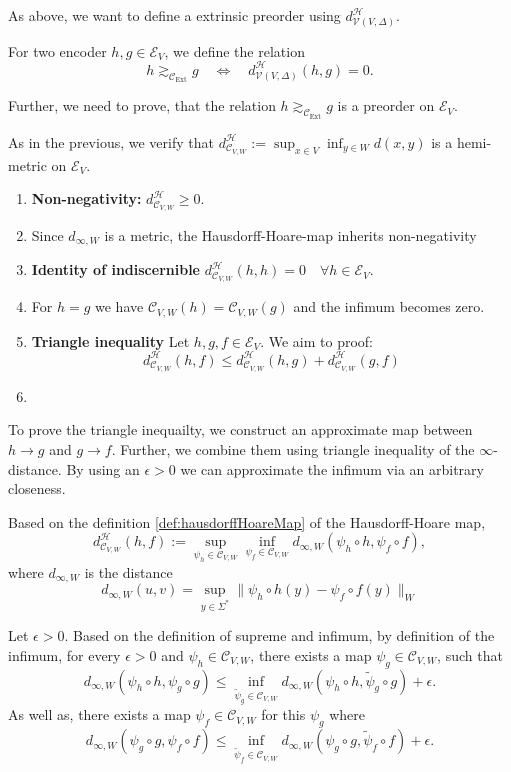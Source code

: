 As above, we want to define a extrinsic preorder using $d^\mathcal{H}_{\mathcal{V}(V,\Delta)}$.

\begin{definition}
For two encoder $h,g\in \mathcal{E}_V$, we define the relation 
\[h \gtrsim_{\mathcal{C}_\text{Ext}} g \quad \Leftrightarrow \quad d^\mathcal{H}_{\mathcal{V}(V,\Delta)}(h,g)=0. \]
\end{definition}

Further, we need to prove, that the relation $h \gtrsim_{\mathcal{C}_\text{Ext}} g$ is a preorder on $\mathcal{E}_V.$

As in the previous, we verify that $d^\mathcal{H}_{\mathcal{C}_{V,W}} := \sup_{x\in V}\inf_{y\in W}d(x,y)$ is a hemi-metric on $\mathcal{E}_V$.

\begin{enumerate}
    \item \textbf{Non-negativity:} $d^\mathcal{H}_{\mathcal{C}_{V,W}} \geq 0$.
    \item[] Since $d_{\infty,W}$ is a metric, the Hausdorff-Hoare-map inherits non-negativity
    \item \textbf{Identity of indiscernible} $d^\mathcal{H}_{\mathcal{C}_{V,W}}(h,h) =  0 \quad \forall h \in \mathcal{E}_V$. 
    \item[] For $h=g$ we have $\mathcal{C}_{V,W}(h)=\mathcal{C}_{V,W}(g)$ and the infimum becomes zero.
    \item \textbf{Triangle inequality} Let $h,g,f \in \mathcal{E}_V$. We aim to proof:
     \[d^\mathcal{H}_{\mathcal{C}_{V,W}}(h,f) \leq d^\mathcal{H}_{\mathcal{C}_{V,W}}(h,g) + d^\mathcal{H}_{\mathcal{C}_{V,W}}(g,f)\]
     \item[]
\end{enumerate}

To prove the triangle inequailty, we construct an approximate map between $h\to g$ and $g \to f$. 
Further, we combine them using triangle inequality of the $\infty$-distance.
By using an $\epsilon>0$ we can approximate the infimum via an arbitrary closeness. 

Based on the definition \ref{def:hausdorffHoareMap} of the Hausdorff-Hoare map, 
\[d^\mathcal{H}_{\mathcal{C}_{V,W}}(h,f):= \sup_{\psi_h\in \mathcal{C}_{V,W}}\inf_{\psi_f\in \mathcal{C}_{V,W}}d_{\infty,W}(\psi_h\circ h, \psi_f\circ f),\] where $d_{\infty,W}$ is the distance \[d_{\infty,W}(u,v)=\sup_{y\in\Sigma^*}\|\psi_h\circ h(y)-\psi_f\circ f(y)\|_W\]


Let $\epsilon > 0$.
Based on the definition of  supreme and infimum, by definition of the infimum, for every $\epsilon>0$ and $\psi_h \in \mathcal{C}_{V,W}$, there exists a map $\psi_g\in \mathcal{C}_{V,W}$, such that
\[d_{\infty,W}(\psi_h\circ h, \psi_g \circ g)\leq \inf_{\tilde{\psi}_g\in \mathcal{C}_{V,W}}d_{\infty,W}(\psi_h\circ h, \tilde{\psi}_g\circ g) +\epsilon.\]
As well as, there exists a map $\psi_f\in\mathcal{C}_{V,W}$ for this $\psi_g$ where
\[d_{\infty, W}(\psi_g\circ g, \psi_f \circ f) \leq \inf_{\tilde{\psi}_f\in \mathcal{C}_{V,W}}d_{\infty,W}(\psi_g\circ g, \tilde{\psi}_f\circ f) +\epsilon.\]

